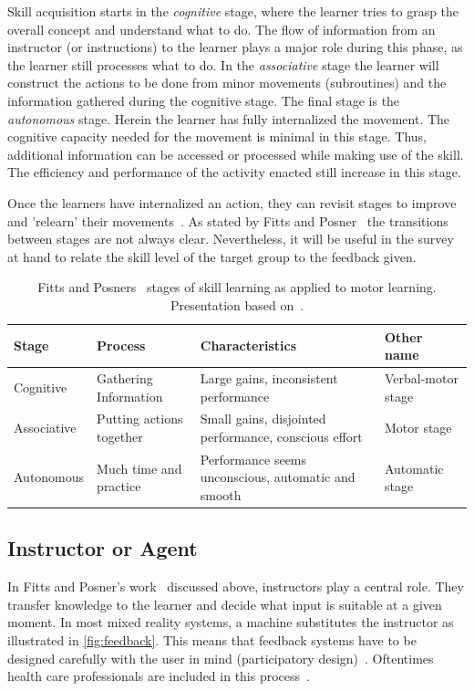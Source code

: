 Skill acquisition starts in the \emph{cognitive} stage, where the learner tries to grasp the overall concept and understand what to do. The flow of information from an instructor (or instructions) to the learner plays a major role during this phase, as the learner still processes what to do. 
In the \emph{associative} stage the learner will construct the actions to be done from minor movements (subroutines) and the information gathered during the cognitive stage.
The final stage is the \emph{autonomous} stage. Herein the learner has fully internalized the movement. The cognitive capacity needed for the movement is minimal in this stage. Thus, additional information can be accessed or processed while making use of the skill. The efficiency and performance of the activity enacted still increase in this stage.

Once the learners have internalized an action, they can revisit stages to improve and 'relearn' their movements~\cite{huber2013AEP}. As stated by Fitts and Posner~\cite{fitts1967HPe} the transitions between stages are not always clear. Nevertheless, it will be useful in the survey at hand to relate the skill level of the target group to the feedback given.

\begin{table}[ht]
\caption{Fitts and Posners~\cite{fitts1967HPe} stages of skill learning as applied to motor learning. Presentation based on~\cite{huber2013AEP}.\label{table:1}}
\begin{tabular}{ |p{2.2cm}||p{2.4cm}|p{4.2cm}|p{2.2cm}|  }

 \hline
 Stage & Process & Characteristics & Other name\\
 \hline
 \hline
 Cognitive   & Gathering Information    &Large gains, inconsistent performance&   Verbal-motor stage\\
 \hline
 Associative&   Putting actions together  & Small gains, disjointed performance, conscious effort   &Motor stage\\
 \hline
 Autonomous &Much time and practice & Performance seems unconscious, automatic and smooth&  Automatic stage\\
 \hline
\end{tabular}
\label{table:stages}
\end{table}

\subsection{Instructor or Agent\label{sec:instructor}}
In Fitts and Posner's work~\cite{fitts1967HPe} discussed above, instructors play a central role. They transfer knowledge to the learner and decide what input is suitable at a given moment. In most mixed reality systems, a machine substitutes the instructor as illustrated in \autoref{fig:feedback}. This means that feedback systems have to be designed carefully with the user in mind (participatory design)~\cite{davies2003vrf}. Oftentimes health care professionals are included in this process~\cite{hilton2011dem}.

